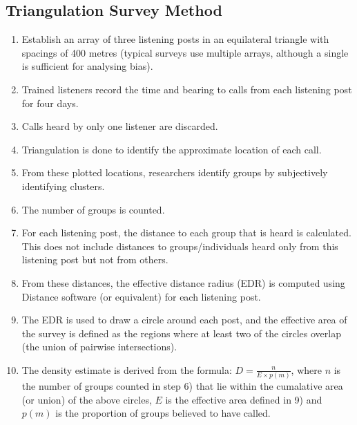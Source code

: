 \documentclass[10pt,a4paper,final]{article}
\begin{document}
\subsection{Triangulation Survey Method}
\begin{tcolorbox}[breakable, colback=blue!5!white,colframe=blue!75!black]
\begin{enumerate}
\item Establish an array of three listening posts in an equilateral triangle with spacings of 400 metres (typical surveys use multiple arrays, although a single is sufficient for analysing bias).

\item Trained listeners record the time and bearing to calls from each listening post for four days.

\item Calls heard by only one listener are discarded.

\item Triangulation is done to identify the approximate location of each call.

\item From these plotted locations, researchers identify groups by subjectively identifying clusters.

\item The number of groups is counted. 

\item For each listening post, the distance to each group that is heard is calculated. This does not include distances to groups/individuals heard only from this listening post but not from others.


\item From these distances, the effective distance radius (EDR) is computed using Distance software (or equivalent) for each listening post.

\item The EDR is used to draw a circle around each post, and the effective area of the survey is defined as the regions where at least two 
of the circles overlap (the union of pairwise intersections).

\item The density estimate is derived from the formula: $D = \frac{n}{E \times p(m)}$, where $n$ is the number of groups counted in step 6) that lie within the cumalative area (or union) of the above circles, $E$ is the effective area defined in 9) and $p(m)$ is the proportion of groups believed to have called. 
\end{enumerate}
\end{tcolorbox}
\end{document}

